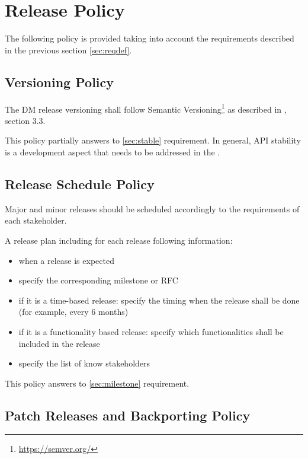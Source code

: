 \section{Release Policy} \label{sec:policy}

The following policy is provided taking into account the requirements described in the previous section \ref{sec:reqdef}.


\subsection{Versioning Policy} \label{sec:versinopolicy}

The DM release versioning shall follow Semantic Versioning\footnote{\url{https://semver.org/}} as described in , section 3.3.

This policy partially answers to \ref{sec:stable} requirement.
In general, API stability is a development aspect that needs to be addressed in the .


\subsection{Release Schedule Policy} \label{sec:schedulepolicy}

Major and minor releases should be scheduled accordingly to the requirements of each stakeholder.

A release plan including for each release following information:

\begin{itemize}
\item when a release is expected
\item specify the corresponding milestone or RFC
\item if it is a time-based release: specify the timing when the release shall be done (for example, every 6 months)
\item if it is a functionality based release: specify which functionalities shall be included in the release
\item specify the list of know stakeholders
\end{itemize}

This policy answers to \ref{sec:milestone} requirement.


\subsection{Patch Releases and Backporting Policy} \label{sec:patchpolicy}

